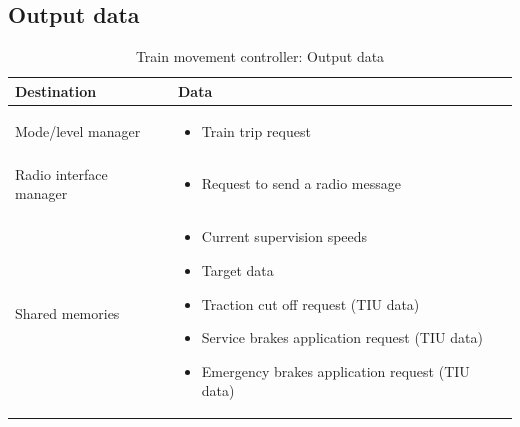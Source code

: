 \documentclass[nocc]{template/openetcs_report}
\begin{document}
\subsection{Output data}
			\begin{longtable}{|l|l|}
				\caption{Train movement controller: Output data}\\ 
				\hline
				
					\begin{minipage}[t]{0.35\linewidth} \textbf{Destination}	\end{minipage} 
				&	\begin{minipage}[t]{0.65\linewidth} \textbf{Data} \end{minipage} \\
				
				\hline
																																									
					\begin{minipage}[t]{0.35\linewidth} Mode/level manager	\end{minipage} 
				&	\begin{minipage}[t]{0.65\linewidth}
						\begin{itemize}
							\item Train trip request
						\end{itemize}
					\end{minipage} \\
				
				\hline
				
					\begin{minipage}[t]{0.35\linewidth} Radio interface manager	\end{minipage} 
				&	\begin{minipage}[t]{0.65\linewidth}
						\begin{itemize}
							\item Request to send a radio message
						\end{itemize}			
					\end{minipage} \\
				
				\hline	
				
					\begin{minipage}[t]{0.35\linewidth} Shared memories	\end{minipage} 
				&	\begin{minipage}[t]{0.65\linewidth}
						\begin{itemize}
							\item Current supervision speeds
							\item Target data
							\item Traction cut off request (TIU data)
							\item Service brakes application request (TIU data)
							\item Emergency brakes application request (TIU data)
						\end{itemize}				
					\end{minipage} \\
				
				\hline	
			\end{longtable}
\newpage				
\end{document}
